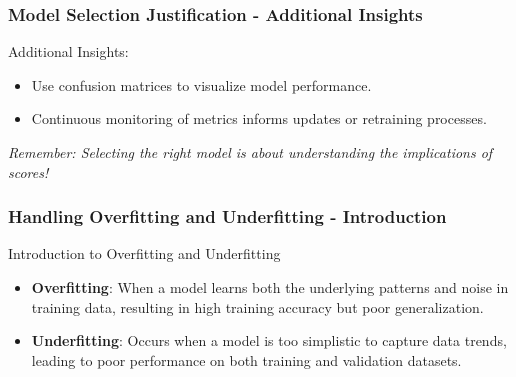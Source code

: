 \documentclass[aspectratio=169]{beamer}
\begin{document}
\begin{frame}[fragile]
    \frametitle{Model Selection Justification - Additional Insights}
    Additional Insights:
    \begin{itemize}
        \item Use confusion matrices to visualize model performance.
        \item Continuous monitoring of metrics informs updates or retraining processes.
    \end{itemize}
    
    \textit{Remember: Selecting the right model is about understanding the implications of scores!}
\end{frame}

\begin{frame}[fragile]
    \frametitle{Handling Overfitting and Underfitting - Introduction}
    \begin{block}{Introduction to Overfitting and Underfitting}
        \begin{itemize}
            \item \textbf{Overfitting}: When a model learns both the underlying patterns and noise in training data, resulting in high training accuracy but poor generalization.
            \item \textbf{Underfitting}: Occurs when a model is too simplistic to capture data trends, leading to poor performance on both training and validation datasets.
        \end{itemize}
    \end{block}
\end{frame}
\end{document}
